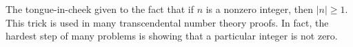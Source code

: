 \documentclass[12pt]{article}
\begin{document}
The tongue-in-cheek  given to the fact that if $n$ is a nonzero integer, then $|n| \geq 1$. This trick is used in many transcendental number theory proofs. In fact, the hardest step of many problems is showing that a particular integer is not zero.
\end{document}
